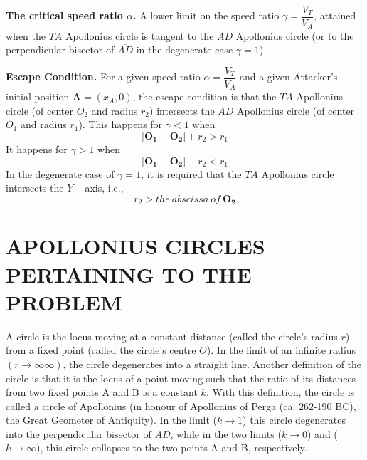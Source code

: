 \textbf{The critical speed ratio $\overline{\alpha}$.} A lower limit on the speed ratio $\gamma=\dfrac{V_{T}}{V_{A}}$, attained when the $TA$ Apollonius circle is tangent to the $AD$ Apollonius circle (or to the perpendicular bisector of $\overline{AD}$ in the degenerate case $\gamma=1$).   

\textbf{Escape Condition.} For a given speed ratio $\alpha=\dfrac{V_{T}}{V_{A}}$ and a given Attacker's initial position $\boldsymbol{A}=(x_{A},0)$, the escape condition is that the $TA$ Apollonius circle (of center $O_2$ and radius $r_2$) intersects the $AD$ Apollonius circle (of center $O_1$ and radius $r_1$). This happens for $\gamma<1$ when
\begin{equation}
\lvert \boldsymbol{O_{1}}-\boldsymbol{O_{2}}\rvert+r_{2}>r_{1}
\end{equation}
It happens for $\gamma>1$ when
\begin{equation}
\lvert \boldsymbol{O_{1}}-\boldsymbol{O_{2}}\rvert-r_{2}<r_{1}
\end{equation}
In the degenerate case of $\gamma=1$, it is required that the $TA$ Apollonius circle intersects the $Y-$axis, i.e., 
\begin{equation}
r_{2}>the\ abscissa\ of\ \boldsymbol{O_{2}}
\end{equation}

\section{APOLLONIUS CIRCLES PERTAINING TO THE PROBLEM}

A circle is the locus moving at a constant distance (called the circle's radius $r$) from a fixed point (called the circle's centre $O$).
In the limit of an infinite radius $(r\longrightarrow\infty∞)$, the circle degenerates into a straight line.
Another definition of the circle is that it is the locus of a point moving such that the ratio of its distances from two fixed points A and B is a constant $k$. With this definition, the circle is called a circle of Apollonius (in honour of Apollonius of Perga (ca. 262-190 BC), the Great Geometer of Antiquity). In the limit ($k\longrightarrow1$) this circle degenerates into the perpendicular bisector of $\overline{AD}$, while in the two limits ($k\longrightarrow0$) and ($k\longrightarrow\infty$), this circle collapses to the two points A and B, respectively. \\

